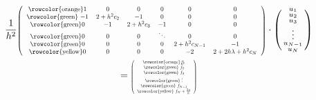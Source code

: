 \begin{gather*}
    \frac{1}{h^2}
    \resizebox{0.75\columnwidth}{!}{%
        $\left(\begin{tabular}{cccccc}
                \rowcolor{orange}$1$  & $0$        & $0$        & $0$      & $0$            & $0$                  \\
                \rowcolor{green} $-1$ & $2+h^2c_2$ & $-1$       & $0$      & $0$            & $0$                  \\
                \rowcolor{green}$0$   & $-1$       & $2+h^2c_3$ & $-1$     & $0$            & $0$                  \\
                \rowcolor{green}$0$   & $0$        & $0$        & $\ddots$ & $0$            & $0$                  \\
                \rowcolor{green}$0$   & $0$        & $0$        & $0$      & $2+h^2c_{N-1}$ & $-1$                 \\
                \rowcolor{yellow}$0$  & $0$        & $0$        & $0$      & $-2$           & $2+2h\lambda+h^2c_N$ \\
            \end{tabular}\right)$}%
    \cdot
    \left(\begin{smallmatrix}
            u_1    \\
            u_2    \\
            u_3    \\
            \vdots \\
            u_{N-1} \\
            u_N    \\
        \end{smallmatrix}\right)\\
    =
    \resizebox{0.2\columnwidth}{!}{%
        $\left(\begin{tabular}{c}
                \rowcolor{orange}$\frac{\alpha}{h^2}$ \\
                \rowcolor{green} $f_2$                \\
                \rowcolor{green} $f_3$                \\
                \rowcolor{green} $\vdots$             \\
                \rowcolor{green} $f_{N-1}$            \\
                \rowcolor{yellow} $f_N+\frac{2g}{h}$  \\
            \end{tabular}\right)$}%
\end{gather*}
